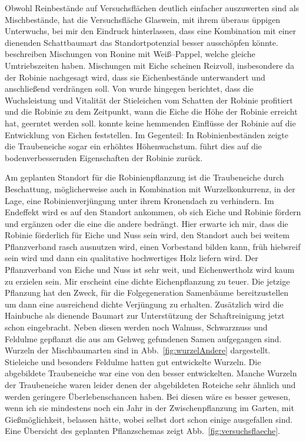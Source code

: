 \documentclass[twocolumn]{scrartcl}
\begin{document}
Obwohl Reinbestände auf Versuchsflächen deutlich einfacher auszuwerten sind als Mischbestände,
hat die Versuchsfläche Glaswein, mit ihrem überaus üppigen Unterwuchs, bei mir den Eindruck hinterlassen,
dass eine Kombination mit einer dienenden Schattbaumart das Standortpotenzial besser ausschöpfen könnte.
\cite{redei2006robiniePappel}
beschreiben Mischungen von Ronine mit Weiß--Pappel, welche gleiche
Umtriebszeiten haben. Mischungen mit Eiche scheinen Reizvoll,
insbesondere da der Robinie nachgesagt wird, dass sie Eichenbestände
unterwandert und anschließend verdrängen soll. Von \cite{kallina1888robinie} wurde
hingegen berichtet, dass die Wuchsleistung und Vitalität der
Stieleichen vom Schatten der Robinie profitiert und die Robinie zu dem
Zeitpunkt, wann die Eiche die Höhe der Robinie erreicht hat, geerntet
werden soll. \cite{feher2024robinie} konnte keine hemmenden Einflüsse
der Robinie auf die Entwicklung von Eichen feststellen. Im Gegenteil:
In Robinienbeständen zeigte die Traubeneiche sogar ein erhöhtes
Höhenwachstum. \cite{foeldes1903robinie} führt dies auf die
bodenverbessernden Eigenschaften der Robinie zurück.

Am geplanten Standort für die Robinienpflanzung ist die Traubeneiche durch Beschattung,
möglicherweise auch in Kombination mit Wurzelkonkurrenz, in der Lage, eine Robinienverjüngung unter ihrem Kronendach zu verhindern.
Im Endeffekt wird es auf
den Standort ankommen, ob sich Eiche und Robinie fördern und ergänzen
oder die eine die andere bedrängt. Hier erwarte ich mir, dass die
Robinie förderlich für Eiche und Nuss sein wird, den Standort auch bei
weitem Pflanzverband rasch ausnutzen wird, einen Vorbestand bilden
kann, früh hiebsreif sein wird und dann ein qualitative hochwertiges
Holz liefern wird. Der Pflanzverband von Eiche und Nuss ist
sehr weit, und Eichenwertholz wird kaum zu erzielen sein. Mir
erscheint eine dichte Eichenpflanzung zu teuer. Die jetzige Pflanzung
hat den Zweck, für die Folgegeneration Samenbäume bereitzustellen um
dann eine ausreichend dichte Verjüngung zu erhalten. Zusätzlich wird
die Hainbuche als dienende Baumart zur Unterstützung der
Schaftreinigung jetzt schon eingebracht. Neben diesen werden noch
Walnuss, Schwarznuss und Feldulme gepflanzt die aus am Gehweg gefundenen
Samen aufgegangen sind. Wurzeln der Mischbaumarten sind in
Abb.~\ref{fig:wurzelAndere} dargestellt. Stieleiche und besonders Feldulme
hatten gut entwickelte Wurzeln. Die abgebildete Traubeneiche war eine
von den besser entwickelten. Manche Wurzeln der Traubeneiche waren leider denen der abgebildeten
Roteiche sehr ähnlich und werden geringere Überlebenschancen haben. Bei diesen wäre es besser gewesen, wenn ich sie mindestens
noch ein Jahr in der Zwischenpflanzung im Garten, mit Gießmöglichkeit,
belassen hätte, wobei selbst dort schon einige ausgefallen
sind. Eine Übersicht des geplanten Pflanzschemas zeigt
Abb.~\ref{fig:versuchsflaeche}.
\end{document}
